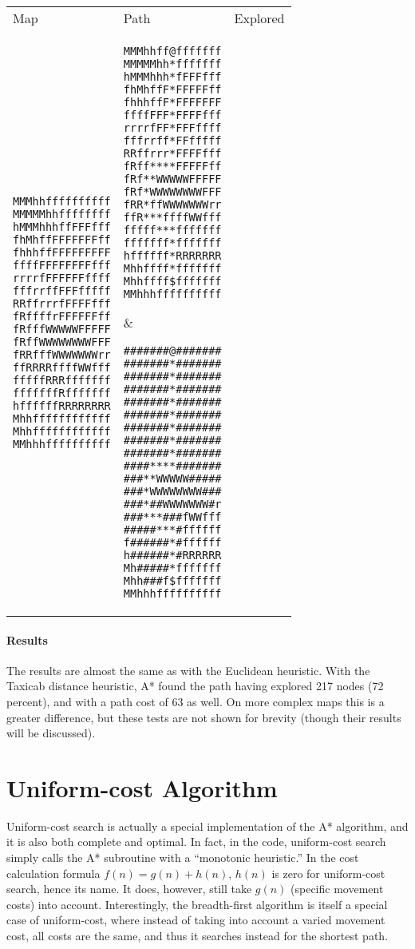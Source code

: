 \documentclass[12pt, article]{scrartcl}
\begin{document}
\begin{tabular}{p{2in} p{2in} p{2in}}
Map & Path & Explored \\

\begin{verbatim}
MMMhhffffffffff
MMMMMhhffffffff
hMMMhhhffFFFfff
fhMhffFFFFFFFff
fhhhffFFFFFFFFF
ffffFFFFFFFFfff
rrrrfFFFFFFffff
fffrrffFFFfffff
RRffrrrfFFFFfff
fRffffrFFFFFFff
fRfffWWWWWFFFFF
fRffWWWWWWWWFFF
fRRfffWWWWWWWrr
ffRRRRffffWWfff
fffffRRRfffffff
fffffffRfffffff
hffffffRRRRRRRR
Mhhffffffffffff
Mhhffffffffffff
MMhhhffffffffff
\end{verbatim}
&
\begin{verbatim}
MMMhhff@fffffff
MMMMMhh*fffffff
hMMMhhh*fFFFfff
fhMhffF*FFFFFff
fhhhffF*FFFFFFF
ffffFFF*FFFFfff
rrrrfFF*FFFffff
fffrrff*FFfffff
RRffrrr*FFFFfff
fRff****FFFFFff
fRf**WWWWWFFFFF
fRf*WWWWWWWWFFF
fRR*ffWWWWWWWrr
ffR***ffffWWfff
fffff***fffffff
fffffff*fffffff
hffffff*RRRRRRR
Mhhffff*fffffff
Mhhffff$fffffff
MMhhhffffffffff
\end{verbatim}
&
\begin{verbatim}
#######@#######
#######*#######
#######*#######
#######*#######
#######*#######
#######*#######
#######*#######
#######*#######
#######*#######
####****#######
###**WWWWW#####
###*WWWWWWWW###
###*##WWWWWWW#r
###***###fWWfff
#####***#ffffff
f######*#ffffff
h######*#RRRRRR
Mh#####*fffffff
Mhh###f$fffffff
MMhhhffffffffff
\end{verbatim}
\end{tabular}
\paragraph{Results}
The results are almost the same as with the Euclidean heuristic. With the Taxicab distance heuristic, A* found the path having explored 217 nodes (72 percent), and with a path cost of 63 as well. On more complex maps this is a greater difference, but these tests are not shown for brevity (though their results will be discussed). \\

\section{Uniform-cost Algorithm}
Uniform-cost search is actually a special implementation of the A* algorithm, and it is also both complete and optimal. In fact, in the code, uniform-cost search simply calls the A* subroutine with a ``monotonic heuristic.'' In the cost calculation formula $f(n) = g(n) + h(n)$, $h(n)$ is zero for uniform-cost search, hence its name. It does, however, still take $g(n)$ (specific movement costs) into account. Interestingly, the breadth-first algorithm is itself a special case of uniform-cost, where instead of taking into account a varied movement cost, all costs are the same, and thus it searches instead for the shortest path. \\
\end{document}
